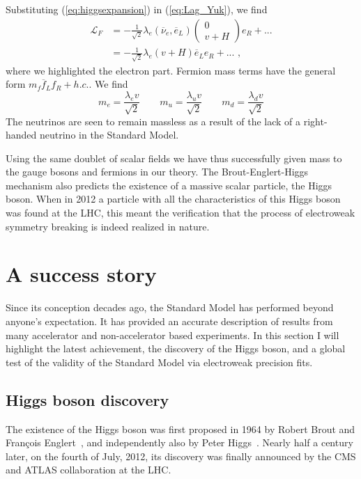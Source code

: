 Substituting (\ref{eq:higgsexpansion}) in (\ref{eq:Lag_Yuk}), we find 
\begin{align}
  \mathcal{L}_F &= - \frac{1}{\sqrt{2}} \lambda_e (\overline{\nu}_e, \overline{e}_L) 
		  \begin{pmatrix}0 \\ v+H \end{pmatrix} e_R + ... \\
                &= - \frac{1}{\sqrt{2}} \lambda_e (v+H) \overline{e}_L e_R + ... \textrm{ ,}
  \label{eq:yukawa}
\end{align}
where we highlighted the electron part. 
Fermion mass terms have the general form $m_f \overline{f}_L f_R + h.c.$. We find
\[m_e = \frac{\lambda_e v}{\sqrt{2}} \qquad m_u = \frac{\lambda_u v}{\sqrt{2}} \qquad m_d =
\frac{\lambda_d v}{\sqrt{2}}\]
The neutrinos are seen to remain massless as a result of the lack of a right-handed neutrino in the
Standard Model. 

Using the same doublet of scalar fields we have thus successfully given mass to the gauge bosons and
fermions in our theory. The Brout-Englert-Higgs mechanism also predicts the existence of a massive
scalar particle, the Higgs boson. 
When in 2012 a particle with all the characteristics of this Higgs boson was found at the LHC, this
meant the verification that the process of electroweak symmetry breaking is indeed realized in
nature. 


\section{A success story \label{sec:SM_success}}

Since its conception decades ago, the Standard Model has performed beyond anyone's expectation. 
It has provided an accurate description of results from many accelerator and non-accelerator based
experiments. In this section I will highlight the latest achievement, the discovery of the Higgs
boson, and a global test of the validity of the Standard Model via electroweak precision fits. 

\subsection{Higgs boson discovery}

The existence of the Higgs boson was first proposed in 1964 by Robert Brout and Fran\c{c}ois
Englert~\cite{Englert:1964et}, and independently also by Peter Higgs~\cite{Higgs:1964pj}. Nearly
half a century later, on the fourth of July, 2012, its discovery was finally announced by the CMS
and ATLAS collaboration at the LHC.

